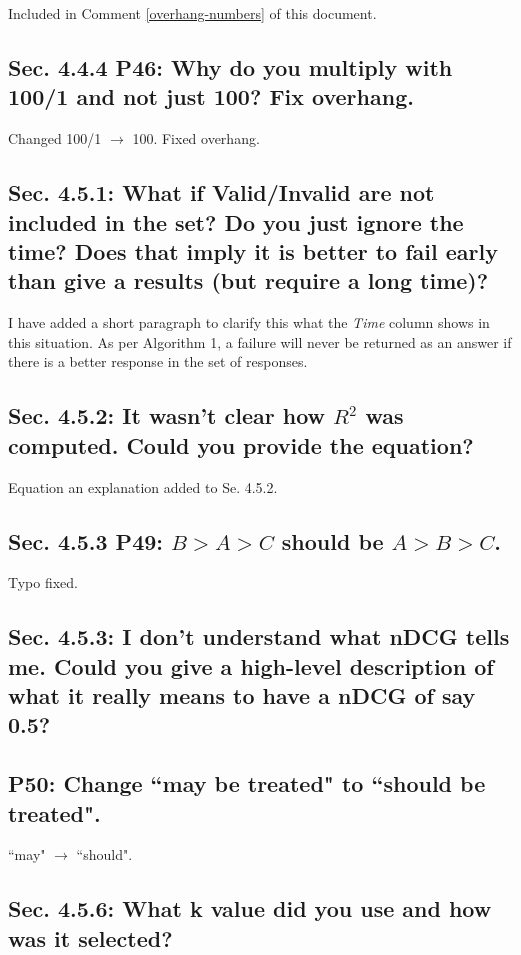 \documentclass[]{article}
\begin{document}
Included in Comment \ref{overhang-numbers} of this document.

\subsection{Sec. 4.4.4 P46: Why do you multiply with 100/1 and not just 100? Fix overhang.}

Changed 100/1 $\rightarrow$ 100. Fixed overhang.

\subsection{Sec. 4.5.1: What if Valid/Invalid are not included in the set? Do you just ignore the time? Does that imply it is better to fail early than give a results (but require a long time)?}

I have added a short paragraph to clarify this what the \textit{Time} column shows in this situation. 
As per Algorithm 1, a failure will never be returned as an answer if there is a better response in the set of responses. 

\subsection{Sec. 4.5.2: It wasn't clear how $R^{2}$ was computed. Could you provide the equation?}

Equation an explanation added to Se. 4.5.2.

\subsection{Sec. 4.5.3 P49: $B > A > C$ should be $A > B > C$.}

Typo fixed.

\subsection{Sec. 4.5.3: I don't understand what nDCG tells me. Could you give a high-level description of what it really means to have a nDCG of say 0.5?}

\subsection{P50: Change ``may be treated" to ``should be treated".} 

``may" $\rightarrow$ ``should".
	
\subsection{Sec. 4.5.6: What k value did you use and how was it selected?}
\end{document}
